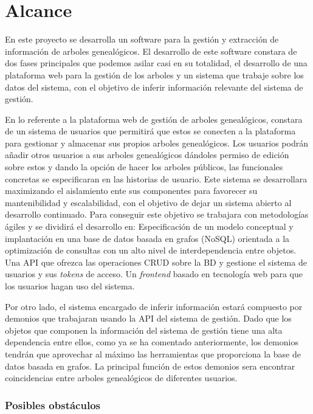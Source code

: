 \documentclass[12pt]{article} %
\begin{document}
\section{Alcance} 
En este proyecto se desarrolla un software para la gestión y extracción de información de arboles genealógicos. El desarrollo de este software constara de dos fases principales que podemos asilar casi en su totalidad, el desarrollo de una plataforma web para la gestión de los arboles y un sistema que trabaje sobre los datos del sistema, con el objetivo de inferir información relevante del sistema de gestión. 

En lo referente a la plataforma web de gestión de arboles genealógicos, constara de un sistema de usuarios que permitirá que estos se conecten a la plataforma para gestionar y almacenar sus propios arboles genealógicos. Los usuarios podrán añadir otros usuarios a sus arboles genealógicos dándoles permiso de edición sobre estos y dando la opción de hacer los arboles públicos, las funcionales concretas se especificaran en las historias de usuario.
Este sistema se desarrollara maximizando el aislamiento ente sus componentes para favorecer su mantenibilidad y escalabilidad, con el objetivo de dejar un sistema abierto al desarrollo continuado. Para conseguir este objetivo se trabajara con metodologías ágiles y se dividirá el desarrollo en:
Especificación de un modelo conceptual y implantación en una base de datos basada en grafos (NoSQL) orientada a la optimización de consultas con un alto nivel de interdependencia entre objetos.
Una API que ofrezca las operaciones CRUD sobre la BD y gestione el sistema de usuarios y sus \textit{tokens} de acceso.
Un \textit{frontend} basado en tecnología web para que los usuarios hagan uso del sistema.

Por otro lado, el sistema encargado de inferir información estará compuesto por demonios que trabajaran usando la API del sistema de gestión. Dado que los objetos que componen la información  del sistema de gestión tiene una alta dependencia entre ellos, como ya se ha comentado anteriormente, los demonios tendrán que aprovechar al máximo las herramientas que proporciona la base de datos basada en grafos. La principal función de estos demonios sera encontrar coincidencias entre arboles genealógicos de diferentes usuarios.

\subsubsection{Posibles obstáculos}
\end{document}
